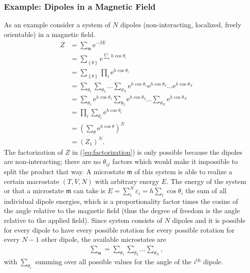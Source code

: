 \documentclass[a4paper,10pt]{article}
\numberwithin{equation}{section}
\begin{document}
\begin{multicols}{2}
\subsubsection{Example: Dipoles in a Magnetic Field}
As an example consider a system of $N$ dipoles (non-interacting, localized, freely orientable) in a magnetic field.
\begin{align} 
          Z &= \sum_{\mathfrak{m}}^{}\text{e}^{-\beta E}\\
            &= \sum_{ \left\{\theta \right\}}^{}\text{e}^{\sum_{i}^{}h\cos \theta _i}\\
            &= \sum_{ \left\{\theta \right\}}^{}\prod_{i}^{}\text{e}^{h\cos \theta _i}\\
            &= \sum_{\theta _1}^{}\sum_{\theta _2}^{}\hdots \sum_{\theta _N}^{}\text{e}^{h\cos \theta _1}\text{e}^{h\cos \theta _2}\hdots \text{e}^{h\cos \theta _N}\\
            &= \sum_{\theta _1}^{}\text{e}^{h\cos \theta _1}\sum_{\theta _2}^{}\text{e}^{h\cos \theta _2}\hdots \sum_{\theta _N}^{}\text{e}^{h\cos \theta _N} \label{eq:factorization}\\
            &= \prod_{i}^{}\sum_{\theta _i}^{}\text{e}^{h\cos \theta _i}\\
            &= \left(\sum_{\theta }^{}\text{e}^{h\cos \theta }\right)^N\\
            &= \left(Z_1\right)^N
.\end{align} 
The factorization of $Z$ in (\ref{eq:factorization}) is only possible because the dipoles are non-interacting; there are no $\theta _{ij}$ factors which would make it impossible to split the product that way.
A microstate $\mathfrak{m}$ of this system is able to realize a certain macrostate $\left(T,V,N\right)$ with arbitrary energy $E$.
The energy of the system or that a microstate $\mathfrak{m}$ can take is $E=\sum_{i}^{N}\varepsilon _i=h\sum_{i}^{}\cos \theta _i$ the sum of all individual dipole energies, which is a proportionality factor times the cosine of the angle relative to the magnetic field (thus the degree of freedom is the angle relative to the applied field).
Since system consists of $N$ dipoles and it is possible for every dipole to have every possible rotation for every possible rotation for every $N-1$ other dipole, the available microstates are
\begin{align} 
  \sum_{\mathfrak{m}}^{}=\sum_{\theta _1}^{}\sum_{\theta _2}^{}\hdots \sum_{\theta _N}^{}
,\end{align} 
with $\sum_{\theta _i}^{}$ summing over all possible values for the angle of the $i^{\text{th}}$ dipole.

\end{multicols}
\end{document}
